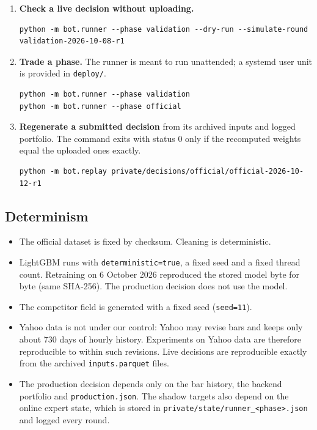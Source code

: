 \documentclass[11pt,a4paper]{article}
\newcommand{\code}[1]{\texttt{#1}}
\begin{document}
\begin{enumerate}[leftmargin=1.4em]
\begin{lstlisting}
# expected: 0fe5e29dca33147f92af90df10de88eb
#           6eaef4b67007836d388ec8895fc3650e
\end{lstlisting}
Outputs go to \code{private/results/}: a summary (\code{experiments.json}) and one CSV file of per-window results for
each stage. Every table in this document was produced from these files.
\item \textbf{Check a live decision without uploading.}
\begin{lstlisting}
python -m bot.runner --phase validation --dry-run --simulate-round validation-2026-10-08-r1
\end{lstlisting}
\item \textbf{Trade a phase.} The runner is meant to run unattended; a systemd user unit is provided in \code{deploy/}.
\begin{lstlisting}
python -m bot.runner --phase validation
python -m bot.runner --phase official
\end{lstlisting}
\item \textbf{Regenerate a submitted decision} from its archived inputs and logged portfolio. The command exits with
status 0 only if the recomputed weights equal the uploaded ones exactly.
\begin{lstlisting}
python -m bot.replay private/decisions/official/official-2026-10-12-r1
\end{lstlisting}
\end{enumerate}

\subsection{Determinism}
\begin{itemize}[nosep]
  \item The official dataset is fixed by checksum. Cleaning is deterministic.
  \item LightGBM runs with \code{deterministic=true}, a fixed seed and a fixed thread count. Retraining on 6 October 2026
        reproduced the stored model byte for byte (same SHA-256). The production decision does not use the model.
  \item The competitor field is generated with a fixed seed (\code{seed=11}).
  \item Yahoo data is not under our control: Yahoo may revise bars and keeps only about 730 days of hourly history.
        Experiments on Yahoo data are therefore reproducible to within such revisions. Live decisions are reproducible
        exactly from the archived \code{inputs.parquet} files.
  \item The production decision depends only on the bar history, the backend portfolio and \code{production.json}. The
        shadow targets also depend on the online expert state, which is stored in \code{private/state/runner\_<phase>.json}
        and logged every round.
\end{itemize}
\end{document}
